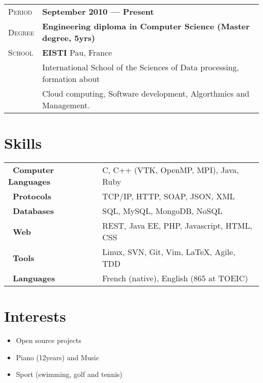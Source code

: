 \documentclass[a4paper, oneside, final]{scrartcl} %
\newcommand{\gray}{\rowcolor[gray]{.90}} %
\begin{document}
\begin{center}
\begin{tabularx}{1\linewidth}{>{\raggedleft\scshape}p{2cm}X}
  \gray Period & \textbf{September 2010 --- Present}\\
    \gray Degree & \textbf{Engineering diploma in Computer Science (Master degree, 5yrs)}\\
  \gray School & \textbf{EISTI} \hfill Pau, France\\
  & International School of the Sciences of Data processing, formation about\\
  & Cloud computing, Software development, Algorthmics and Management.
\end{tabularx}


\section{Skills}

\begin{tabular}{ @{} >{\bfseries}l @{\hspace{4ex}} l }
  ~Computer Languages & C, C++ (VTK, OpenMP, MPI), Java, Ruby \\
  ~Protocols          & TCP/IP, HTTP, SOAP, JSON, XML\\
  ~Databases          & SQL, MySQL, MongoDB, NoSQL \\
  ~Web                & REST, Java EE, PHP, Javascript, HTML, CSS \\
  ~Tools              & Linux, SVN, Git, Vim,  \LaTeX, Agile, TDD\\
  ~Languages          & French (native), English (865 at TOEIC)
\end{tabular}




\section{Interests}

\begin{itemize}[noitemsep,topsep=0pt,parsep=0pt,partopsep=0pt]
 \setlength{\itemsep}{1pt}
 \item Open source projects
 \item Piano (12years) and Music
 \item Sport (swimming, golf and tennis)
\end{itemize}


\end{center}
\end{document}
